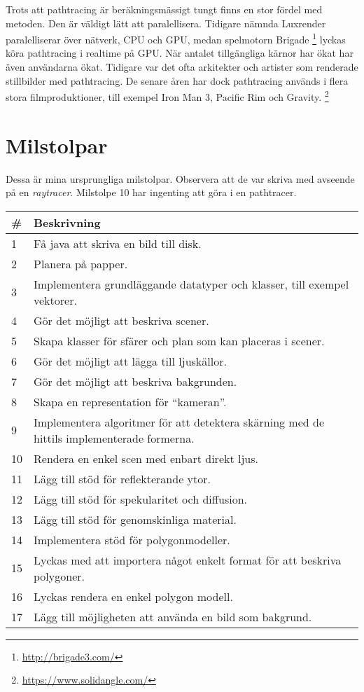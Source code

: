 \documentclass{article}
\begin{document}
Trots att pathtracing är beräkningsmässigt tungt finns en stor fördel
med metoden. Den är väldigt lätt att paralellisera. Tidigare nämnda
Luxrender paralelliserar över nätverk, CPU och GPU, medan spelmotorn Brigade
\footnote{\url{http://brigade3.com/}} lyckas köra pathtracing i
realtime på GPU. När antalet tillgängliga kärnor har ökat har även
användarna ökat. Tidigare var det ofta arkitekter och artister som
renderade stillbilder med pathtracing. De senare åren har dock
pathtracing används i flera stora filmproduktioner, till exempel Iron
Man 3, Pacific Rim och Gravity. \footnote{\url{https://www.solidangle.com/}}




\section{Milstolpar}
Dessa är mina ursprungliga milstolpar. Observera att de var skriva med
avseende på en \emph{raytracer}. Milstolpe 10 har ingenting att göra i
en pathtracer.

\begin{tabular}{|l|l|}
  \hline
\# & Beskrivning \\
\hline
1 & Få java att skriva en bild till disk. \\
2 & Planera på papper. \\
3 & Implementera grundläggande datatyper och klasser, till exempel vektorer. \\
4 & Gör det möjligt att beskriva scener. \\
5 & Skapa klasser för sfärer och plan som kan placeras i scener. \\
6 & Gör det möjligt att lägga till ljuskällor. \\
7 & Gör det möjligt att beskriva bakgrunden. \\
8 & Skapa en representation för ``kameran''. \\
9 & Implementera algoritmer för att detektera skärning med de hittils implementerade formerna. \\
10 & Rendera en enkel scen med enbart direkt ljus. \\
11 & Lägg till stöd för reflekterande ytor. \\
12 & Lägg till stöd för spekularitet och diffusion. \\
13 & Lägg till stöd för genomskinliga material. \\
14 & Implementera stöd för polygonmodeller. \\
15 & Lyckas med att importera något enkelt format för att beskriva polygoner. \\
16 & Lyckas rendera en enkel polygon modell. \\
17 & Lägg till möjligheten att använda en bild som bakgrund. \\
\hline
\end{tabular}
\end{document}

